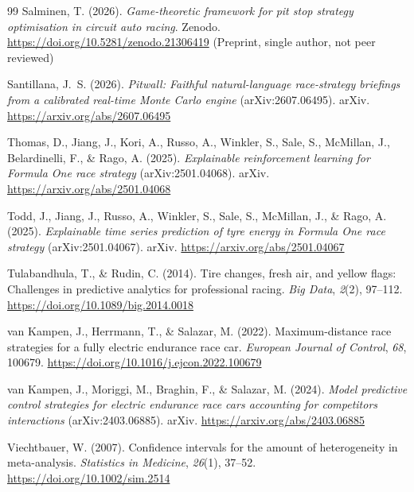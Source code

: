 \begin{thebibliography}{99}
Salminen, T. (2026). \emph{Game-theoretic framework for pit stop strategy
optimisation in circuit auto racing}. Zenodo.
\url{https://doi.org/10.5281/zenodo.21306419} (Preprint, single author, not
peer reviewed)

Santillana, J.~S. (2026). \emph{Pitwall: Faithful natural-language
race-strategy briefings from a calibrated real-time Monte Carlo engine}
(arXiv:2607.06495). arXiv. \url{https://arxiv.org/abs/2607.06495}

Thomas, D., Jiang, J., Kori, A., Russo, A., Winkler, S., Sale, S., McMillan,
J., Belardinelli, F., \& Rago, A. (2025). \emph{Explainable reinforcement
learning for Formula One race strategy} (arXiv:2501.04068). arXiv.
\url{https://arxiv.org/abs/2501.04068}

Todd, J., Jiang, J., Russo, A., Winkler, S., Sale, S., McMillan, J., \& Rago,
A. (2025). \emph{Explainable time series prediction of tyre energy in Formula
One race strategy} (arXiv:2501.04067). arXiv.
\url{https://arxiv.org/abs/2501.04067}

Tulabandhula, T., \& Rudin, C. (2014). Tire changes, fresh air, and yellow
flags: Challenges in predictive analytics for professional racing. \emph{Big
Data}, \emph{2}(2), 97--112. \url{https://doi.org/10.1089/big.2014.0018}

van Kampen, J., Herrmann, T., \& Salazar, M. (2022). Maximum-distance race
strategies for a fully electric endurance race car. \emph{European Journal of
Control}, \emph{68}, 100679.
\url{https://doi.org/10.1016/j.ejcon.2022.100679}

van Kampen, J., Moriggi, M., Braghin, F., \& Salazar, M. (2024). \emph{Model
predictive control strategies for electric endurance race cars accounting for
competitors interactions} (arXiv:2403.06885). arXiv.
\url{https://arxiv.org/abs/2403.06885}

Viechtbauer, W. (2007). Confidence intervals for the amount of heterogeneity in
meta-analysis. \emph{Statistics in Medicine}, \emph{26}(1), 37--52.
\url{https://doi.org/10.1002/sim.2514}

\end{thebibliography}
